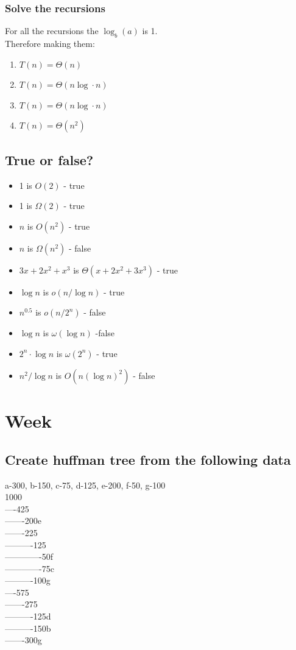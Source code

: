 \documentclass[12pt, a4paper]{article}
\begin{document}
			\subsubsection{Solve the recursions}
				For all the recursions the $\log_b(a)$ is 1.\\
				Therefore making them:
				\begin{enumerate}
					\item $T(n)=\Theta(n)$
					\item $T(n)=\Theta( n \log\cdot n)$
					\item $T(n)=\Theta(n\log \cdot n)$
					\item $T(n)=\Theta(n^2)$
				\end{enumerate}
		\subsection{True or false?}
			\begin{itemize}
					  \item 1 is $O(2)$ - true
						\item 1 is $\Omega(2)$ - true
						\item $n$ is $O(n^2)$ - true
						\item $n$ is $\Omega(n^2)$ - false
						\item $3x+2x^2+x^3$ is $\Theta(x+2x^2+3x^3)$ - true
						\item $\log n$ is $o(n/\log n)$ - true
						\item $n^{0.5}$ is $o(n/2^n)$ - false
						\item $\log n$ is $\omega(\log n)$ -false
						\item $2^n\cdot \log n$ is $\omega(2^n)$ - true
						\item $n^2/\log n$ is $O(n(\log n)^2)$ - false
			\end{itemize}
	\section{Week}
		\subsection{Create huffman tree from the following data}
			a-300, b-150, c-75, d-125, e-200, f-50, g-100\\[4mm]
			
			1000\\
			----425\\
			-------200e\\
			-------225\\
			----------125\\
			-------------50f\\
			-------------75c\\
			----------100g\\
			----575\\
			-------275\\
			----------125d\\
			----------150b\\
			-------300g
\end{document}
